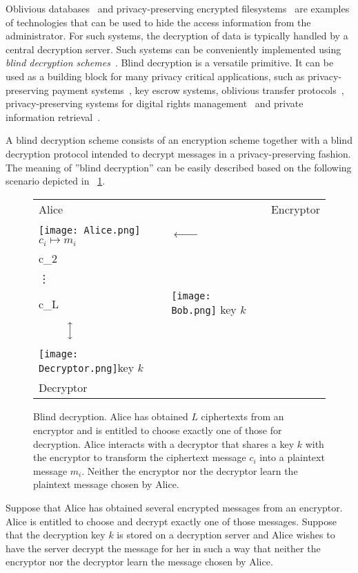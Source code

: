 \documentclass[10pt,journal]{IEEEtran}
\begin{document}
Oblivious databases~\cite{Coull_2009} and privacy-preserving encrypted filesystems~\cite{Green_2011}
are examples of technologies that can be used 
to hide the access information from the administrator.
For such systems, the decryption of data is typically handled by a central decryption server.
Such systems can be conveniently implemented using \emph{blind decryption schemes}~\cite{Sakurai_1996}.
Blind decryption is a versatile primitive.
It can be used as a building block for many privacy critical applications,
such as privacy-preserving
payment systems~\cite{Chaum_1983}, key escrow systems, oblivious transfer protocols~\cite{Green_2007},
privacy-preserving systems for digital rights management~\cite{Perlman_2010,Lei_2012}
and private information retrieval~\cite{Schnorr_2000}.

A blind decryption scheme consists of an encryption scheme together with a blind decryption protocol
intended to decrypt messages in a privacy-preserving fashion.
The meaning of ''blind decryption'' can be easily described based on the following scenario depicted in \figurename~\ref{fig:blind_decryption_basic}.
\begin{figure}[!t]
\centering
\begin{tabular}{m{3.1cm}m{1.3cm}m{0.5cm}m{2.1cm}}
Alice & & & Encryptor\\
\texttt{[image: Alice.png]}~$c_i \mapsto m_i$ & $\xleftarrow{\quad\quad\quad}$ & \[\left\{ \begin{matrix} c_1\\c_2\\ \vdots \\c_L \end{matrix} \right.\] & \texttt{[image: Bob.png]} key $k$\\
~~~~~$\Big\updownarrow$ \\
\\
\texttt{[image: Decryptor.png]}key $k$\\
Decryptor
\end{tabular}
\caption{Blind decryption. Alice has obtained $L$ ciphertexts from an encryptor and is entitled to choose exactly one of those for decryption. Alice interacts with a decryptor that shares a key $k$
with the encryptor to transform
the ciphertext message $c_i$ into a plaintext message $m_i$. Neither the encryptor nor the decryptor learn the plaintext message chosen by Alice.}
\label{fig:blind_decryption_basic}
\end{figure}
Suppose that Alice has obtained several encrypted messages from an encryptor. Alice is entitled to choose and decrypt exactly one of those messages.
Suppose that the decryption key $k$ is stored on a decryption server and Alice wishes to have the server decrypt the message for her
in such a way that neither the encryptor nor the decryptor learn the message chosen by Alice.
\end{document}
